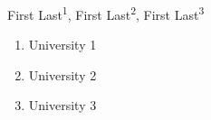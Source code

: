First Last\textsuperscript{1}, First Last\textsuperscript{2}, First Last\textsuperscript{3}

\begin{enumerate}
\item University 1
\item University 2
\item University 3
\end{enumerate}

  